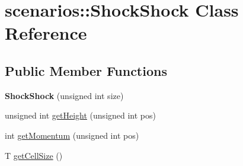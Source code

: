 \hypertarget{classscenarios_1_1ShockShock}{\section{scenarios\-:\-:Shock\-Shock Class Reference}
\label{classscenarios_1_1ShockShock}
}
\subsection*{Public Member Functions}
\begin{DoxyCompactItemize}
\item 
\hypertarget{classscenarios_1_1ShockShock_abf31656cead3d8be82de8c5c8ae80377}{{\bfseries Shock\-Shock} (unsigned int size)}\label{classscenarios_1_1ShockShock_abf31656cead3d8be82de8c5c8ae80377}

\item 
unsigned int \hyperlink{classscenarios_1_1ShockShock_abfe0a08457be114937612b4f76b727b2}{get\-Height} (unsigned int pos)
\item 
int \hyperlink{classscenarios_1_1ShockShock_a28bde75f3af7362592738e9b3646bda8}{get\-Momentum} (unsigned int pos)
\item 
T \hyperlink{classscenarios_1_1ShockShock_a5d21aae3177a5b2279cc79133f082e30}{get\-Cell\-Size} ()
\end{DoxyCompactItemize}



